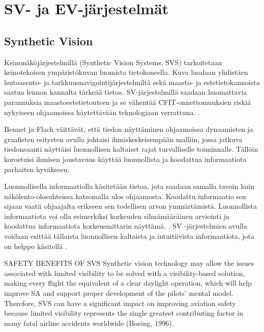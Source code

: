 \documentclass[utf8,bachelor,manualbib]{gradu3}
\begin{document}
\chapter{SV- ja EV-järjestelmät}

\section{Synthetic Vision}

Keinonäköjärjestelmillä (Synthetic Vision Systems, SVS) tarkoitetaan keinotekoisen ympäristökuvan luomista tietokoneella. Kuva luodaan yhdistäen lentoasento- ja tarkkuusnavigointijärjestelmiltä sekä maasto- ja estetietokannoista saatua lennon kannalta tärkeää tietoa. SV-järjestelmillä saadaan huomattavia parannuksia maastoestetietouteen ja se vähentää CFIT-onnettomuuksien riskiä nykyiseen ohjaamoissa käytettävään teknologiaan verrattuna. \citep{baileyym2007}.

Bennet ja Flach \citeyearpar{bennetflach1994} väittävät, että tiedon näyttäminen ohjaamoissa dynaamisten ja graafisten esitysten avulla johtaisi ihmiskeskeisempään malliin, jossa jatkuva tiedonsaanti näyttäisi luonnollisen kaltaiset rajat turvalliselle toiminnalle. Tällöin korostuisi ihmisen joustavuus käyttää luonnollista ja koodattua informaatiota parhaiten hyväkseen.

Luonnollisella informaatiolla käsitetään tietoa, jota saadaan samalla tavoin kuin näkölento-olosuhteissa katsomalla ulos ohjaamosta. Koodattu informaatio sen sijaan vaatii ohjaajalta erikseen sen todellisen arvon ymmärtämistä. Luonnollista informaatiota voi olla esimerkiksi korkeuden silmämääräinen arviointi ja koodattua informaatiota korkeusmittarin näyttämä. \citep{prinzel2004}. SV -järjestelmien avulla voidaan esittää tällaista luonnollisen kaltaista ja intuitiivista informaatiota, jota on helppo käsitellä \citep{wickensandre1990}.










SAFETY BENEFITS OF SVS
Synthetic vision technology may allow the issues associated with limited visibility
to be solved with a visibility-based solution, making every flight the equivalent of
a clear daylight operation, which will help improve SA and support proper development
of the pilots’ mental model. Therefore, SVS can have a significant impact
on improving aviation safety because limited visibility represents the single greatest
contributing factor in many fatal airline accidents worldwide (Boeing, 1996).\citep{prinzel2004}
\end{document}
